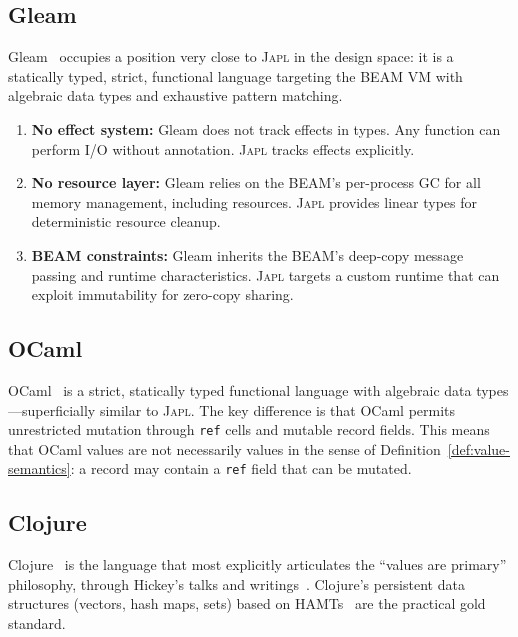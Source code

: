 \documentclass[11pt]{article}
\theoremstyle{definition}
\theoremstyle{remark}
\newcommand{\japl}{\textsc{Japl}}
\begin{document}
\subsection{Gleam}

Gleam~\cite{gleam2024} occupies a position very close to \japl{} in
the design space: it is a statically typed, strict, functional language
targeting the BEAM VM with algebraic data types and exhaustive pattern
matching.

\begin{enumerate}
  \item \textbf{No effect system:} Gleam does not track effects in
    types.  Any function can perform I/O without annotation.  \japl{}
    tracks effects explicitly.

  \item \textbf{No resource layer:} Gleam relies on the BEAM's
    per-process GC for all memory management, including resources.
    \japl{} provides linear types for deterministic resource cleanup.

  \item \textbf{BEAM constraints:} Gleam inherits the BEAM's
    deep-copy message passing and runtime characteristics.  \japl{}
    targets a custom runtime that can exploit immutability for
    zero-copy sharing.
\end{enumerate}

\subsection{OCaml}

OCaml~\cite{leroy2014ocaml} is a strict, statically typed functional
language with algebraic data types---superficially similar to \japl{}.
The key difference is that OCaml permits unrestricted mutation through
\texttt{ref} cells and mutable record fields.  This means that OCaml
values are not necessarily values in the sense of
Definition~\ref{def:value-semantics}: a record may contain a
\texttt{ref} field that can be mutated.

\subsection{Clojure}

Clojure~\cite{hickey2008clojure} is the language that most explicitly
articulates the ``values are primary'' philosophy, through Hickey's
talks and writings~\cite{hickey2012value}.  Clojure's persistent data
structures (vectors, hash maps, sets) based on
HAMTs~\cite{bagwell2001ideal} are the practical gold standard.
\end{document}
